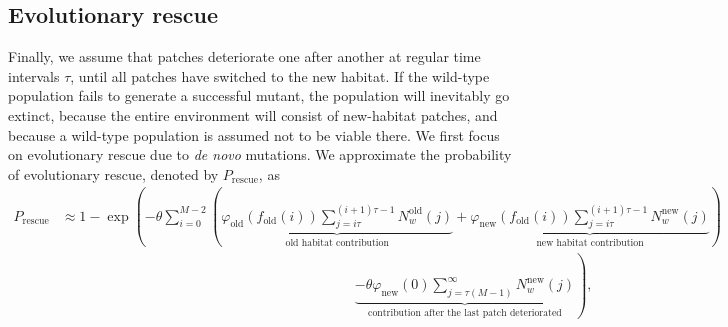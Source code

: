 \documentclass[11pt]{article}
\begin{document}
\subsection*{Evolutionary rescue}
Finally, we assume that patches deteriorate one after another at regular time intervals $\tau$, until all patches have switched to the new habitat. If the wild-type population fails to generate a successful mutant, the population will inevitably go extinct, because the entire environment will consist of new-habitat patches, and because a wild-type population is assumed not to be viable there. 
We first focus on evolutionary rescue due to \textit{de novo} mutations. We approximate the probability of evolutionary rescue, denoted by $P_{\text{rescue}}$, as
\begin{equation}\label{eq:evol_rescue}
    \begin{aligned}
		P_{\text{rescue}} &\approx 1-\exp\left(- \theta \sum_{i=0}^{M-2} \left(\underbrace{\varphi_{\text{old}}\left(f_{\text{old}}(i)\right) \sum_{j=i\tau}^{(i+1)\tau -1} N_w^{\text{old}}(j)}_{\text{old habitat contribution}} + \underbrace{\varphi_{\text{new}}(f_{\text{old}}(i)) \sum_{j=i\tau}^{(i+1)\tau -1} N_w^{\text{new}}(j)}_{\text{new habitat contribution}}\right)\right.\\
		&\qquad\qquad \qquad\qquad\qquad\qquad\qquad \qquad \qquad \qquad\quad  \left.\underbrace{-\theta \varphi_{\text{new}}(0) \sum_{j = \tau (M-1) }^\infty  N_w^{\text{new}}(j)}_{\text{contribution after the last patch deteriorated}}\right),
	\end{aligned}
\end{equation}
\end{document}
